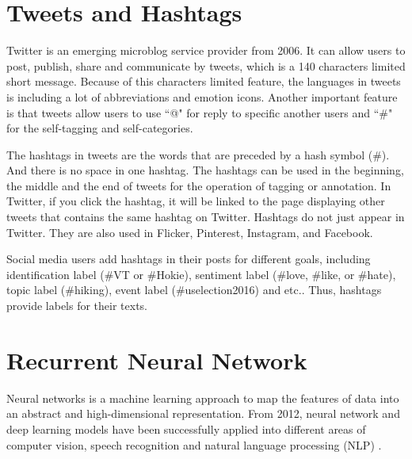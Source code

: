 




\section{Tweets and Hashtags}

Twitter is an emerging microblog service provider from 2006. It can allow users to post, publish, share and communicate by tweets, which is a 140 characters limited short message. Because of this characters limited feature, the languages in tweets is including a lot of abbreviations and emotion icons. Another important feature is that tweets allow users to use ``@" for reply to specific another users and ``\#" for the self-tagging and self-categories. 

The hashtags in tweets are the words that are preceded by a hash symbol (\#). And there is no space in one hashtag. The hashtags can be used in the beginning, the middle and the end of tweets for the operation of tagging or annotation. In Twitter, if you click the hashtag, it will be linked to the page displaying other tweets that contains the same hashtag on Twitter. Hashtags do not just appear in Twitter. They are also used in Flicker, Pinterest, Instagram, and Facebook. 


Social media users add hashtags in their posts for different goals, including identification label (\#VT or \#Hokie), sentiment label (\#love, \#like, or \#hate), topic label (\#hiking), event label (\#uselection2016) and etc.. Thus, hashtags provide labels for their texts.

\section{Recurrent Neural Network}
Neural networks is a machine learning approach to map the features of data into an abstract and high-dimensional representation. From 2012, neural network and deep learning models have been successfully applied into different areas of computer vision, speech recognition and natural language processing (NLP) \cite{LeCun2015}. 

